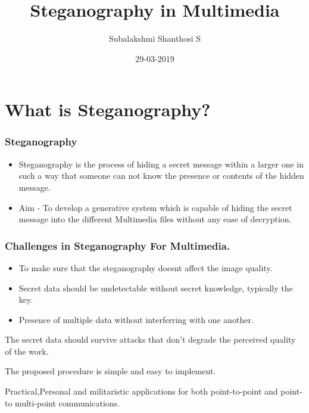\documentclass{beamer} %
\title{Steganography in Multimedia}
\author{Subalakshmi Shanthosi S}
\institute{SSN College of Engineering}
\date{}
\date[short date]{29-03-2019}
\theoremstyle{definition} %
\begin{document}
\begin{frame} 
\titlepage
\end{frame}

\section{What is Steganography?} %

\begin{frame} 
\frametitle{Steganography}
 \begin{itemize}
 \item{Steganography is the process of hiding a secret message within a
 larger one in such a way that someone can not know the presence or contents of the hidden message. }
\end{itemize}
\begin{itemize}
 \item{Aim - To develop a generative system which is capable of hiding the secret message into the different Multimedia files without any ease of decryption.}
\end{itemize}

\end{frame}

\begin{frame}
\frametitle{Challenges in Steganography For Multimedia.}
 \begin{itemize}
	\item{To make sure that the steganography doesnt affect the image quality.}
\end{itemize}
\begin{itemize}
	\item{ Secret data should be undetectable without secret
		knowledge, typically the key.}
\end{itemize}
\begin{itemize}
	\item {Presence of multiple data without interferring with one another.}
\end{itemize}
\begin{itemize}
	\item{The secret data should survive attacks that don’t
		degrade the perceived quality of the work.}
   \item{The proposed procedure is simple and easy to implement.
   	\item Practical,Personal and militaristic applications for both point-to-point and point-to multi-point communications. }
\end{itemize}
\end{frame}
\end{document}
